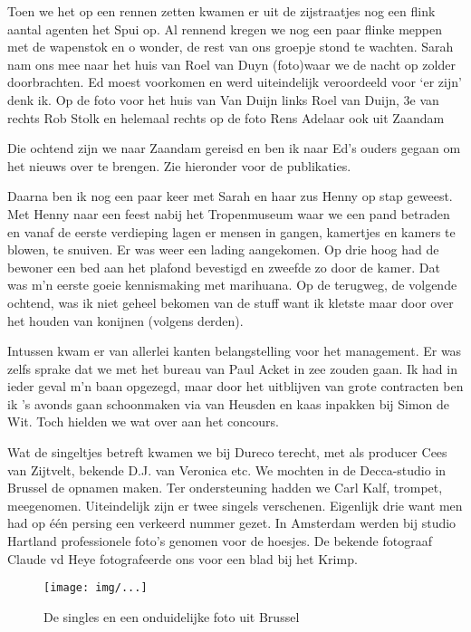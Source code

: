 \documentclass[10pt,twoside,openright]{memoir}
\begin{document}
Toen we het op een rennen zetten kwamen er uit de zijstraatjes nog een flink aantal agenten het Spui op. Al rennend kregen we nog een paar flinke meppen met de wapenstok en o wonder, de rest van ons groepje stond te wachten. Sarah nam ons mee naar het huis van Roel van Duyn (foto)waar we de nacht op zolder doorbrachten. Ed moest voorkomen en werd uiteindelijk veroordeeld voor ‘er zijn’ denk ik. Op de foto voor het huis van Van Duijn links Roel van Duijn, 3e van rechts Rob Stolk en helemaal rechts op de foto Rens Adelaar ook uit Zaandam

Die ochtend zijn we naar Zaandam gereisd en ben ik naar Ed’s ouders gegaan om het nieuws over te brengen. Zie hieronder voor de publikaties.

Daarna ben ik nog een paar keer met Sarah en haar zus Henny op stap geweest. Met Henny naar een feest nabij het Tropenmuseum waar we een pand betraden en vanaf de eerste verdieping lagen er mensen in gangen, kamertjes en kamers te blowen, te snuiven. Er was weer een lading aangekomen. Op drie hoog had de bewoner een bed aan het plafond bevestigd en zweefde zo door de kamer. Dat was m’n eerste goeie kennismaking met marihuana. Op de terugweg, de volgende ochtend, was ik niet geheel bekomen van de stuff want ik kletste maar door over het houden van konijnen (volgens derden).

Intussen kwam er van allerlei kanten belangstelling voor het management. Er was zelfs sprake dat we met het bureau van Paul Acket in zee zouden gaan. Ik had in ieder geval m’n baan opgezegd, maar door het uitblijven van grote contracten ben ik ’s avonds gaan schoonmaken via van Heusden en kaas inpakken bij Simon de Wit. Toch hielden we wat over aan het concours.

Wat de singeltjes betreft kwamen we bij Dureco terecht, met als producer Cees van Zijtvelt, bekende D.J. van Veronica etc. We mochten in de Decca-studio in Brussel de opnamen maken. Ter ondersteuning hadden we Carl Kalf, trompet, meegenomen. Uiteindelijk zijn er twee singels verschenen. Eigenlijk drie want men had op één persing een verkeerd nummer gezet. In Amsterdam werden bij studio Hartland professionele foto’s genomen voor de hoesjes. De bekende fotograaf Claude vd Heye fotografeerde ons voor een blad bij het Krimp.

\begin{figure}[t]
\texttt{[image: img/...]}
\caption{De singles en een onduidelijke foto uit Brussel}
\end{figure}
\end{document}

